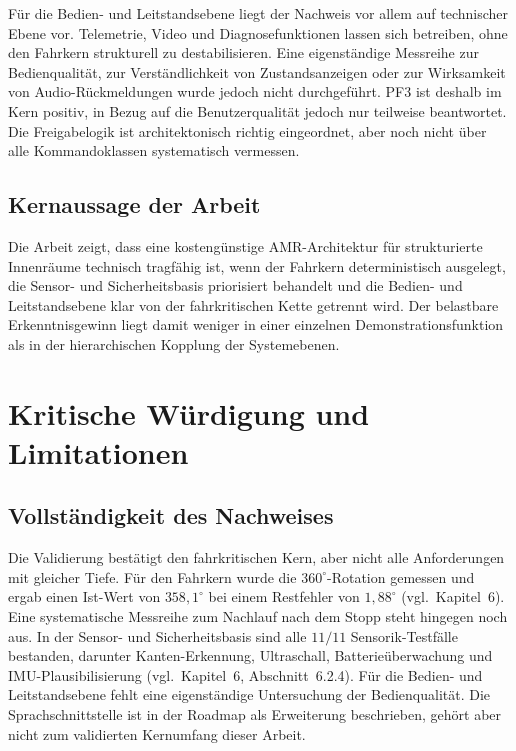 Für die Bedien- und Leitstandsebene liegt der Nachweis vor allem auf technischer Ebene vor. Telemetrie, Video und Diagnosefunktionen lassen sich betreiben, ohne den Fahrkern strukturell zu destabilisieren. Eine eigenständige Messreihe zur Bedienqualität, zur Verständlichkeit von Zustandsanzeigen oder zur Wirksamkeit von Audio-Rückmeldungen wurde jedoch nicht durchgeführt. PF3 ist deshalb im Kern positiv, in Bezug auf die Benutzerqualität jedoch nur teilweise beantwortet. Die Freigabelogik ist architektonisch richtig eingeordnet, aber noch nicht über alle Kommandoklassen systematisch vermessen.

\subsection{Kernaussage der Arbeit}

Die Arbeit zeigt, dass eine kostengünstige AMR-Architektur für strukturierte Innenräume technisch tragfähig ist, wenn der Fahrkern deterministisch ausgelegt, die Sensor- und Sicherheitsbasis priorisiert behandelt und die Bedien- und Leitstandsebene klar von der fahrkritischen Kette getrennt wird. Der belastbare Erkenntnisgewinn liegt damit weniger in einer einzelnen Demonstrationsfunktion als in der hierarchischen Kopplung der Systemebenen.

\section{Kritische Würdigung und Limitationen}

\subsection{Vollständigkeit des Nachweises}

Die Validierung bestätigt den fahrkritischen Kern, aber nicht alle Anforderungen mit gleicher Tiefe. Für den Fahrkern wurde die $360^\circ$-Rotation gemessen und ergab einen Ist-Wert von $358{,}1^\circ$ bei einem Restfehler von $1{,}88^\circ$ (vgl.\ Kapitel~6). Eine systematische Messreihe zum Nachlauf nach dem Stopp steht hingegen noch aus. In der Sensor- und Sicherheitsbasis sind alle $11/11$ Sensorik-Testfälle bestanden, darunter Kanten-Erkennung, Ultraschall, Batterieüberwachung und IMU-Plausibilisierung (vgl.\ Kapitel~6, Abschnitt~6.2.4). Für die Bedien- und Leitstandsebene fehlt eine eigenständige Untersuchung der Bedienqualität. Die Sprachschnittstelle ist in der Roadmap als Erweiterung beschrieben, gehört aber nicht zum validierten Kernumfang dieser Arbeit.

